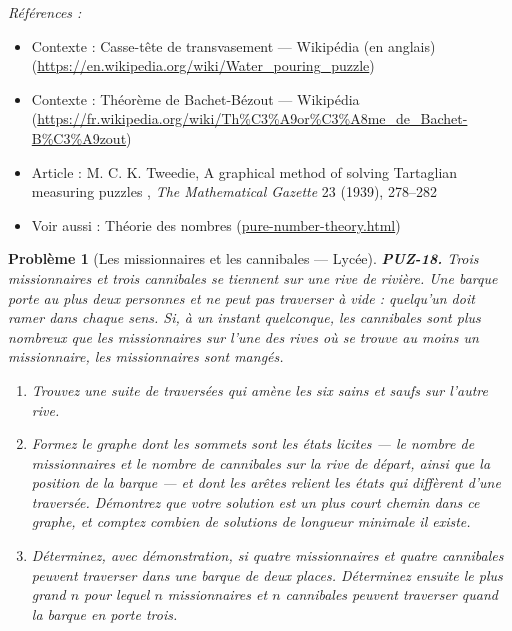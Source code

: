 \documentclass[11pt]{article}
\newtheorem{problem}{Problème}
\newenvironment{refs}{\par\small\noindent\emph{Références :}\begin{itemize}\setlength\itemsep{0pt}}{\end{itemize}\normalsize}
\begin{document}
\begin{refs}
\item Contexte : Casse-tête de transvasement --- Wikipédia (en anglais) (\url{https://en.wikipedia.org/wiki/Water_pouring_puzzle})
\item Contexte : Théorème de Bachet-Bézout --- Wikipédia (\url{https://fr.wikipedia.org/wiki/Th%C3%A9or%C3%A8me_de_Bachet-B%C3%A9zout})
\item Article : M. C. K. Tweedie, \og{} A graphical method of solving Tartaglian measuring puzzles \fg{}, \textit{The Mathematical Gazette} 23 (1939), 278--282
\item Voir aussi : Théorie des nombres (\url{pure-number-theory.html})
\end{refs}

\bigskip

\begin{problem}[{Les missionnaires et les cannibales --- Lycée}]
\textbf{PUZ-18.} Trois missionnaires et trois cannibales se tiennent sur une rive de rivière. Une barque porte au plus deux personnes et ne peut pas traverser à vide : quelqu'un doit ramer dans chaque sens. Si, à un instant quelconque, les cannibales sont plus nombreux que les missionnaires sur l'une des rives où se trouve au moins un missionnaire, les missionnaires sont mangés.
\begin{enumerate}
\item[(a)] Trouvez une suite de traversées qui amène les six sains et saufs sur l'autre rive.
\item[(b)] Formez le graphe dont les sommets sont les états licites --- le nombre de missionnaires et le nombre de cannibales sur la rive de départ, ainsi que la position de la barque --- et dont les arêtes relient les états qui diffèrent d'une traversée. Démontrez que votre solution est un plus court chemin dans ce graphe, et comptez combien de solutions de longueur minimale il existe.
\item[(c)] Déterminez, avec démonstration, si quatre missionnaires et quatre cannibales peuvent traverser dans une barque de deux places. Déterminez ensuite le plus grand $ n $ pour lequel $ n $ missionnaires et $ n $ cannibales peuvent traverser quand la barque en porte trois.
\end{enumerate}

\end{problem}
\end{document}
